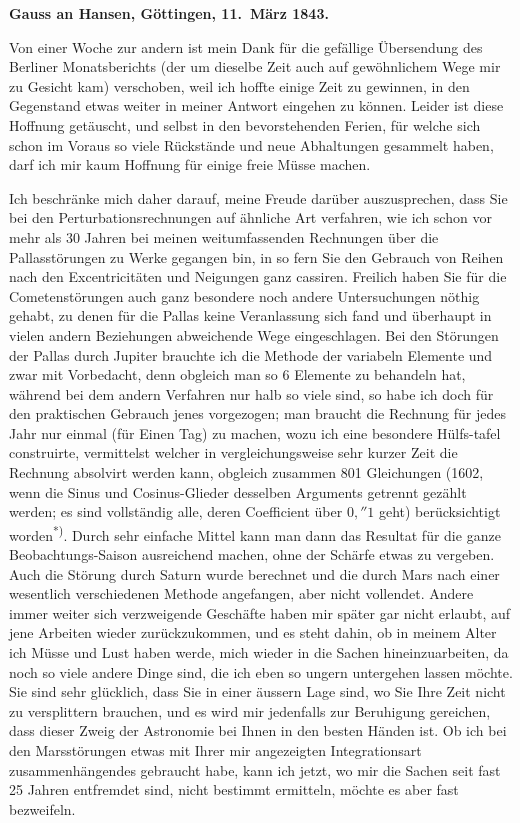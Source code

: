 \documentclass[12pt,a4paper]{article}
\begin{document}
\newpage
\setcounter{page}{446}
%
\medskip\noindent
\textbf{Gauss an Hansen, Göttingen, 11.~März 1843.}

Von einer Woche zur andern ist mein Dank für die gefällige Übersendung des Berliner Monatsberichts (der um dieselbe Zeit auch auf gewöhnlichem Wege mir zu Gesicht kam) verschoben, weil ich hoffte einige Zeit zu gewinnen, in den Gegenstand etwas weiter in meiner Antwort eingehen zu können. Leider ist diese Hoffnung getäuscht, und selbst in den bevorstehenden Ferien, für welche sich schon im Voraus so viele Rückstände und neue Abhaltungen gesammelt haben, darf ich mir kaum Hoffnung für einige freie Müsse machen.

Ich beschränke mich daher darauf, meine Freude darüber auszusprechen, dass Sie bei den Perturbationsrechnungen auf ähnliche Art verfahren, wie ich schon vor mehr als 30 Jahren bei meinen weitumfassenden Rechnungen über die Pallasstörungen zu Werke gegangen bin, in so fern Sie den Gebrauch von Reihen nach den Excentricitäten und Neigungen ganz cassiren. Freilich haben Sie für die Cometenstörungen auch ganz besondere noch andere Untersuchungen nöthig gehabt, zu denen für die Pallas keine Veranlassung sich fand und überhaupt in vielen andern Beziehungen abweichende Wege eingeschlagen. Bei den Störungen der Pallas durch Jupiter brauchte ich die Methode der variabeln Elemente und zwar mit Vorbedacht, denn obgleich man so 6 Elemente zu behandeln hat, während bei dem andern Verfahren nur halb so viele sind, so habe ich doch für den praktischen Gebrauch jenes vorgezogen; man braucht die Rechnung für jedes Jahr nur einmal (für Einen Tag) zu machen, wozu ich eine besondere Hülfs-\n tafel construirte, vermittelst welcher in vergleichungsweise sehr kurzer Zeit die Rechnung absolvirt werden kann, obgleich zusammen 801 Gleichungen (1602, wenn die Sinus und Cosinus-Glieder desselben Arguments getrennt gezählt werden; es sind vollständig alle, deren Coefficient über $0{,}''1$ geht) berücksichtigt worden\textsuperscript{*)}. Durch sehr einfache Mittel kann man dann das Resultat für die ganze Beobachtungs-\n Saison ausreichend machen, ohne der Schärfe etwas zu vergeben. Auch die Störung durch Saturn wurde berechnet und die durch Mars nach einer wesentlich verschiedenen Methode angefangen, aber nicht vollendet. Andere immer weiter sich verzweigende Geschäfte haben mir später gar nicht erlaubt, auf jene Arbeiten wieder zurückzukommen, und es steht dahin, ob in meinem Alter ich Müsse und Lust haben werde, mich wieder in die Sachen hineinzuarbeiten, da noch so viele andere Dinge sind, die ich eben so ungern untergehen lassen möchte. Sie sind sehr glücklich, dass Sie in einer äussern Lage sind, wo Sie Ihre Zeit nicht zu versplittern brauchen, und es wird mir jedenfalls zur Beruhigung gereichen, dass dieser Zweig der Astronomie bei Ihnen in den besten Händen ist. Ob ich bei den Marsstörungen etwas mit Ihrer mir angezeigten Integrationsart zusammenhängendes gebraucht habe, kann ich jetzt, wo mir die Sachen seit fast 25 Jahren entfremdet sind, nicht bestimmt ermitteln, möchte es aber fast bezweifeln.
\end{document}

